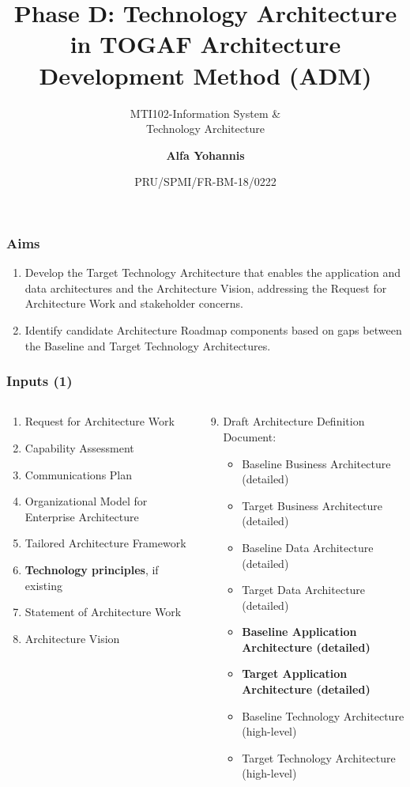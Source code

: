 \documentclass[aspectratio=169, table]{beamer}
\subtitle{MTI102-Information System \&\\Technology Architecture}
\title{\vskip-0.7cm \Large Phase D: Technology Architecture\\in TOGAF Architecture\\Development Method (ADM)}
\date[Serial]{\scriptsize {PRU/SPMI/FR-BM-18/0222}}
\author[Pradita]{\small {\textbf{Alfa Yohannis}}}
\begin{document}
	
	\frame{\titlepage}
	
	\begin{frame}
		\frametitle{Aims}
		\begin{enumerate}
			\item Develop the Target Technology Architecture that enables the application and data architectures and the Architecture Vision, addressing the Request for Architecture Work and stakeholder concerns.
			\item Identify candidate Architecture Roadmap components based on gaps between the Baseline and Target Technology Architectures.
		\end{enumerate}
	\end{frame}
	
	\begin{frame}
		\frametitle{Inputs (1)}
		\vspace{20pt}
		\begin{columns}[onlytextwidth]
			\begin{column}{0.45\textwidth}
				\begin{enumerate}
					\item Request for Architecture Work
					\item Capability Assessment
					\item Communications Plan
					\item Organizational Model for Enterprise Architecture
					\item Tailored Architecture Framework
					\item \textbf{Technology principles}, if existing
					\item Statement of Architecture Work
					\item Architecture Vision
				\end{enumerate}
			\end{column}
			\begin{column}{0.55\textwidth}
				\begin{enumerate}
					\setcounter{enumi}{8}
					\item Draft Architecture Definition Document:
					\begin{itemize}
						\item Baseline Business Architecture (detailed)
						\item Target Business Architecture (detailed)
						\item Baseline Data Architecture (detailed)
						\item Target Data Architecture (detailed)
						\item \textbf{Baseline Application Architecture (detailed)}
						\item \textbf{Target Application Architecture (detailed)}
						\item Baseline Technology Architecture (high-level)
						\item Target Technology Architecture (high-level)
					\end{itemize}
				\end{enumerate}
			\end{column}
		\end{columns}
	\end{frame}
	
\end{document}
